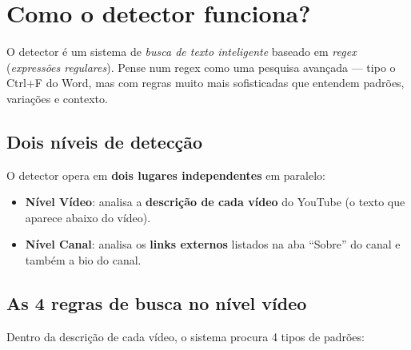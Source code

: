 \documentclass[12pt,a4paper]{article}
\newcommand{\term}[1]{\textcolor{roxo}{\textit{#1}}}
\begin{document}
\section{Como o detector funciona?}
\label{sec:detector}

O detector é um sistema de \term{busca de texto inteligente} baseado em
\term{regex} (\textit{expressões regulares}). Pense num regex como uma
pesquisa avançada --- tipo o Ctrl+F do Word, mas com regras muito mais
sofisticadas que entendem padrões, variações e contexto.

\subsection{Dois níveis de detecção}

O detector opera em \textbf{dois lugares independentes} em paralelo:

\begin{itemize}
  \item \textbf{Nível Vídeo}: analisa a \textbf{descrição de cada vídeo} do
        YouTube (o texto que aparece abaixo do vídeo).
  \item \textbf{Nível Canal}: analisa os \textbf{links externos} listados na
        aba ``Sobre'' do canal e também a bio do canal.
\end{itemize}

\subsection{As 4 regras de busca no nível vídeo}

Dentro da descrição de cada vídeo, o sistema procura 4 tipos de padrões:
\end{document}
